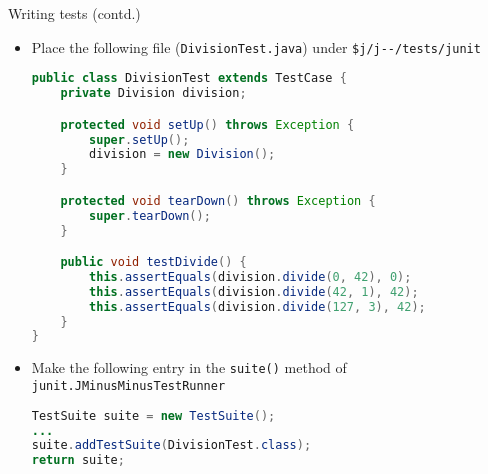\documentclass[8pt,a4paper,compress]{beamer}
\begin{document}
\begin{frame}[fragile]
\pause

Writing tests (contd.)
\begin{itemize}
\item Place the following file (\lstinline{DivisionTest.java}) under \lstinline{$j/j--/tests/junit}

\begin{lstlisting}[language=Java]
public class DivisionTest extends TestCase {
    private Division division;

    protected void setUp() throws Exception {
        super.setUp();
        division = new Division();
    }

    protected void tearDown() throws Exception {
        super.tearDown();
    }

    public void testDivide() {
        this.assertEquals(division.divide(0, 42), 0);
        this.assertEquals(division.divide(42, 1), 42);
        this.assertEquals(division.divide(127, 3), 42);
    }
}
\end{lstlisting}

\item Make the following entry in the \lstinline{suite()} method of \lstinline{junit.JMinusMinusTestRunner}

\begin{lstlisting}[language=Java]
TestSuite suite = new TestSuite();
...
suite.addTestSuite(DivisionTest.class);
return suite;
\end{lstlisting}
\end{itemize}
\end{frame}
\end{document}
